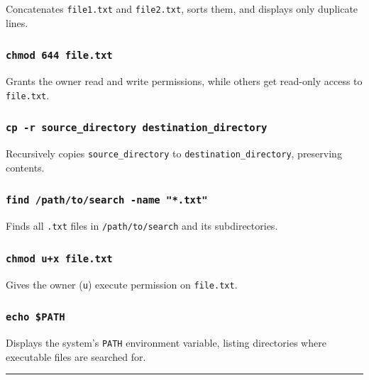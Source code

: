 Concatenates \texttt{file1.txt} and \texttt{file2.txt}, sorts them, and
displays only duplicate lines.

\subsubsection{\texorpdfstring{\texttt{chmod\ 644\ file.txt}}{chmod 644 file.txt}}\label{chmod-644-file.txt}

Grants the owner read and write permissions, while others get read-only
access to \texttt{file.txt}.

\subsubsection{\texorpdfstring{\texttt{cp\ -r\ source\_directory\ destination\_directory}}{cp -r source\_directory destination\_directory}}\label{cp--r-source_directory-destination_directory}

Recursively copies \texttt{source\_directory} to
\texttt{destination\_directory}, preserving contents.

\subsubsection{\texorpdfstring{\texttt{find\ /path/to/search\ -name\ "*.txt"}}{find /path/to/search -name "*.txt"}}\label{find-pathtosearch--name-.txt}

Finds all \texttt{.txt} files in \texttt{/path/to/search} and its
subdirectories.

\subsubsection{\texorpdfstring{\texttt{chmod\ u+x\ file.txt}}{chmod u+x file.txt}}\label{chmod-ux-file.txt}

Gives the owner (\texttt{u}) execute permission on \texttt{file.txt}.

\subsubsection{\texorpdfstring{\texttt{echo\ \$PATH}}{echo \$PATH}}\label{echo-path}

Displays the system's \texttt{PATH} environment variable, listing
directories where executable files are searched for.

\begin{center}\rule{0.5\linewidth}{0.5pt}\end{center}

